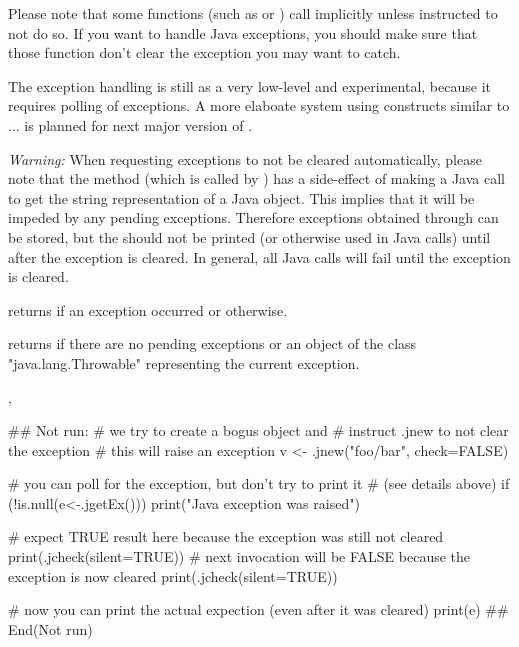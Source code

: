 \begin{Details}\relax
Please note that some functions (such as  or
) call  implicitly unless
instructed to not do so. If you want to handle Java exceptions, you
should make sure that those function don't clear the exception you may
want to catch.

The exception handling is still as a very low-level and experimental,
because it requires polling of exceptions. A more elaboate system
using constructs similar to  ...  is planned for
next major version of .

\emph{Warning:} When requesting exceptions to not be cleared
automatically, please note that the  method (which is
called by ) has a side-effect of making a Java call to get
the string representation of a Java object. This implies that it will
be impeded by any pending exceptions. Therefore exceptions obtained
through  can be stored, but the should not be printed
(or otherwise used in Java calls) until after the exception is
cleared. In general, all Java calls will fail until the exception is
cleared.
\end{Details}
\begin{Value}
 returns  if an exception occurred or
 otherwise.

 returns  if there are no pending exceptions
or an object of the class "java.lang.Throwable" representing the
current exception.
\end{Value}
\begin{SeeAlso}\relax
{}, 
\end{SeeAlso}
\begin{Examples}
\begin{ExampleCode}
## Not run: 
# we try to create a bogus object and
# instruct .jnew to not clear the exception
# this will raise an exception
v <- .jnew("foo/bar", check=FALSE)

# you can poll for the exception, but don't try to print it
# (see details above)
if (!is.null(e<-.jgetEx())) print("Java exception was raised")

# expect TRUE result here because the exception was still not cleared
print(.jcheck(silent=TRUE))
# next invocation will be FALSE because the exception is now cleared
print(.jcheck(silent=TRUE))

# now you can print the actual expection (even after it was cleared)
print(e)
## End(Not run)
\end{ExampleCode}
\end{Examples}

